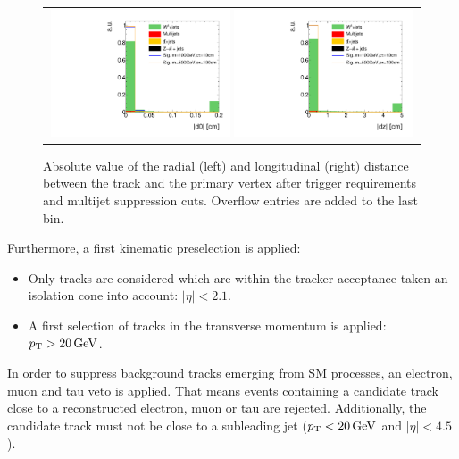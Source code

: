 \begin{figure}[!t]
  \centering 
  \begin{tabular}{c}
    \includegraphics[width=0.49\textwidth]{figures/analysis/AnalysisSelection/chiTracksQCDsupressionTrigger_2Signals_FullBkg/htrackd0_lin.pdf}
    \includegraphics[width=0.49\textwidth]{figures/analysis/AnalysisSelection/chiTracksQCDsupressionTrigger_2Signals_FullBkg/htrackdz_lin.pdf}
  \end{tabular}
  \caption{Absolute value of the radial (left) and longitudinal (right) distance between the track and the primary vertex after trigger requirements and multijet suppression cuts. 
           Overflow entries are added to the last bin.}
  \label{fig:d0_dz}
\end{figure}

Furthermore, a first kinematic preselection is applied:
\begin{itemize}
\renewcommand{\labelitemi}{\footnotesize{\ding{118}}}
\item Only tracks are considered which are within the tracker acceptance taken an isolation cone into account: $|\eta|<2.1$.
\item A first selection of tracks in the transverse momentum is applied: \mbox{$p_{\text{T}}>20\,\text{Ge}\kern-0.06667em\text{V}$}.\\
\end{itemize}

In order to suppress background tracks emerging from SM processes, an electron, muon and tau veto is applied.
That means events containing a candidate track close to a reconstructed electron, muon or tau are rejected.
Additionally, the candidate track must not be close to a subleading jet ($p_{\text{T}}<20\,\text{Ge}\kern-0.06667em\text{V}$ and $|\eta|<4.5$).

